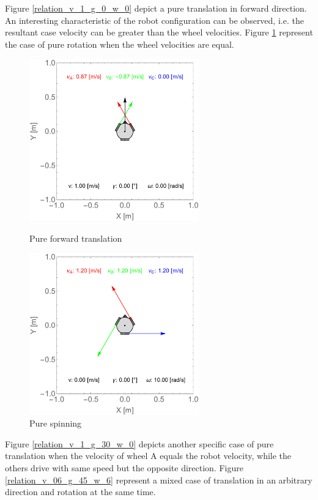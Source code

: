 \documentclass[12pt,english,twoside]{article}
\begin{document}
Figure \ref{relation_v_1_g_0_w_0} depict a pure translation in forward direction. An interesting characteristic of the robot configuration can be observed, i.e. the resultant case velocity can be greater than the wheel velocities. Figure \ref{relation_v_0_g_0_w_10} represent the case of pure rotation when the wheel velocities are equal.
\begin{figure}[htb!]
	\centering
	\centering
	\includegraphics[height=7cm]{figures/2d_simulation/state_v_1_g_0_w_0}
	\caption{Pure forward translation}
	\label{relation_v_1_g_0_w_0}
	\endminipage\hfill
	\centering
	\includegraphics[height=7cm]{figures/2d_simulation/state_v_0_g_0_w_10}
	\caption{Pure spinning}
	\label{relation_v_0_g_0_w_10}
	\endminipage\hfill
\end{figure}
Figure \ref{relation_v_1_g_30_w_0} depicts another specific case of pure translation when the velocity of wheel A equals the robot velocity, while the others drive with same speed but the opposite direction. Figure \ref{relation_v_06_g_45_w_6} represent a mixed case of translation in an arbitrary direction and rotation at the same time.
\end{document}
